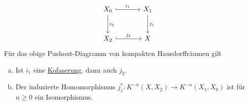\begin{theorem}[label=sub:39,{name=[Isomorphismus in $K$-Theorie bei Pushout-Diagrammen]}]
\[
	\begin{tikzcd}[sep=large]
		X_0 \rar[hook,"i_1"] \dar["i_2"]& X_1 \dar["j_1"] \\
		X_2 \rar[hook,"j_2"] & X
	\end{tikzcd}
\]
Für das obige Pushout-Diagramm von kompakten Hausdorffräumen gilt
\begin{enumerate}[a)]
	\item Ist $i_1$ eine \hyperref[def_koraumpaar]{Kofaserung}, dann auch $j_2$.
	\item Der induzierte Homomorphismus $j_1^* \colon K^{-n}(X,X_2) \to K^{-n}(X_1,X_0)$ ist für $n \ge 0$ ein Isomorphismus.
\end{enumerate}	
\end{theorem}

